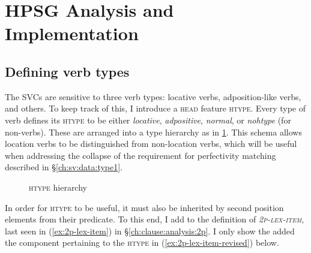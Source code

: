 \section{HPSG Analysis and Implementation} \label{ch:sv:analysis}

\subsection{Defining verb types} \label{ch:sv:analysis:htype}

The SVCs are sensitive to three verb types: locative verbs, adposition-like verbs, and others. To keep track of this, I introduce a \textsc{head} feature \textsc{htype}. Every type of verb defines its \textsc{htype} to be either \textit{locative}, \textit{adpositive}, \textit{normal}, or \textit{nohtype} (for non-verbs). These are arranged into a type hierarchy as in \cref{figure:htypehierarchy}. This schema allows location verbs to be distinguished from non-location verbs, which will be useful when addressing the collapse of the requirement for perfectivity matching described in \S\ref{ch:sv:data:type1}.

\begin{figure}[H]
\begin{center}
\caption{\textsc{htype} hierarchy}
\label{figure:htypehierarchy}
\end{center}
\end{figure}

In order for \textsc{htype} to be useful, it must also be inherited by second position elements from their predicate. To this end, I add to the definition of \textsc{\textit{2p-lex-item}}, last seen in (\ref{ex:2p-lex-item}) in \S\ref{ch:clause:analysis:2p}. I only show the added the component pertaining to the \textsc{htype} in (\ref{ex:2p-lex-item-revised}) below.

